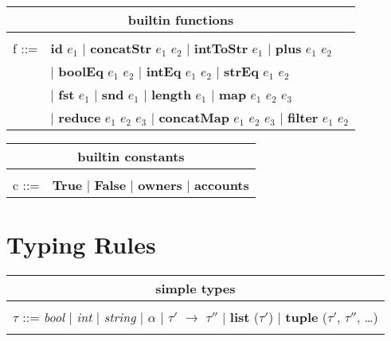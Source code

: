 \documentclass[10pt, oneside]{article}
\begin{document}
\begin{center}
\begin{tabular}{rl}
\multicolumn{2}{c}{builtin functions}\\
\hline\\

f ::=& \textbf{id} $e_1$ $|$ \textbf{concatStr} $e_1$ $e_2$ $|$ \textbf{intToStr} $e_1$ $|$ \textbf{plus} $e_1$ $e_2$\\
&$|$ \textbf{boolEq} $e_1$ $e_2$ $|$ \textbf{intEq} $e_1$ $e_2$ $|$ \textbf{strEq} $e_1$ $e_2$\\
&$|$ \textbf{fst} $e_1$ $|$ \textbf{snd} $e_1$ $|$ \textbf{length} $e_1$ $|$ \textbf{map} $e_1$ $e_2$ $e_3$ \\
&$|$ \textbf{reduce} $e_1$ $e_2$ $e_3$ $|$ \textbf{concatMap} $e_1$ $e_2$ $e_3$ $|$ \textbf{filter} $e_1$ $e_2$ \\ 


\end{tabular}
\end{center}



\begin{center}
\begin{tabular}{rl}
\multicolumn{2}{c}{builtin constants}\\
\hline\\

c ::=& \textbf{True} $|$ \textbf{False} $|$ \textbf{owners} $|$ \textbf{accounts}\\

\end{tabular}
\end{center}


\section {Typing Rules}

\begin{center}
\begin{tabular}{l}
\multicolumn{1}{c}{simple types}\\
\hline\\

$\tau$ ::= \emph{bool} $|$ \emph{int} $|$ \emph{string} $|$ $\alpha$ $|$ $\tau'$ $\rightarrow$ $\tau''$ $|$ \textbf{list} ($\tau'$) $|$ \textbf{tuple} ($\tau'$, $\tau''$, \ldots)\\

\\
\end{tabular}
\end{center}
\end{document}
